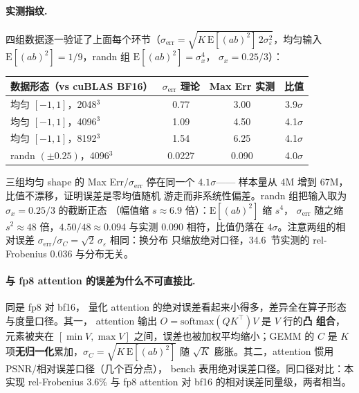 \paragraph{实测指纹.} 四组数据逐一验证了上面每个环节（$\sigma_{\text{err}}
= \sqrt{K\,\mathrm{E}[(ab)^2]\,2\sigma_\varepsilon^2}$，均匀输入
$\mathrm{E}[(ab)^2] = 1/9$，randn 组 $\mathrm{E}[(ab)^2] = \sigma_x^4$，
$\sigma_x = 0.25/3$）：

\begin{center}
\footnotesize
\begin{tabular}{lccc}
\toprule
数据形态（vs cuBLAS BF16） & $\sigma_{\text{err}}$ 理论 & Max Err 实测 & 比值 \\
\midrule
均匀 $[-1,1]$，2048$^3$ & 0.77 & 3.00 & 3.9$\sigma$ \\
均匀 $[-1,1]$，4096$^3$ & 1.09 & 4.50 & 4.1$\sigma$ \\
均匀 $[-1,1]$，8192$^3$ & 1.54 & 6.25 & 4.1$\sigma$ \\
randn $(\pm 0.25)$，4096$^3$ & 0.0227 & 0.090 & 4.0$\sigma$ \\
\bottomrule
\end{tabular}
\end{center}

三组均匀 shape 的 Max Err/$\sigma_{\text{err}}$ 停在同一个 $4.1\sigma$——
样本量从 $4\text{M}$ 增到 $67\text{M}$，比值不漂移，证明误差是零均值随机
游走而非系统性偏差。randn 组把输入取为 $\sigma_x = 0.25/3$ 的截断正态
（幅值缩 $s \approx 6.9$ 倍）：$\mathrm{E}[(ab)^2]$ 缩 $s^4$，
$\sigma_{\text{err}}$ 随之缩 $s^2 \approx 48$ 倍，$4.50/48 \approx 0.094$
与实测 0.090 相符，比值仍落在 $4\sigma$。注意两组的相对误差
$\sigma_{\text{err}}/\sigma_C = \sqrt{2}\,\sigma_\varepsilon$ 相同：换分布
只缩放绝对口径，34.6~节实测的 rel-Frobenius 0.036 与分布无关。

\paragraph{与 fp8 attention 的误差为什么不可直接比.} 同是 fp8 对 bf16，
量化 attention 的绝对误差看起来小得多，差异全在算子形态与度量口径。其一，
attention 输出 $O = \mathrm{softmax}(QK^{\top})V$ 是 $V$ 行的\textbf{凸
组合}，元素被夹在 $[\min V, \max V]$ 之间，误差也被加权平均缩小；GEMM 的
$C$ 是 $K$ 项\textbf{无归一化}累加，$\sigma_C = \sqrt{K\,\mathrm{E}[(ab)^2]}$
随 $\sqrt{K}$ 膨胀。其二，attention 惯用 PSNR/相对误差口径（几个百分点），
bench 表用绝对误差口径。同口径对比：本实现 rel-Frobenius 3.6\% 与 fp8
attention 对 bf16 的相对误差同量级，两者相当。

